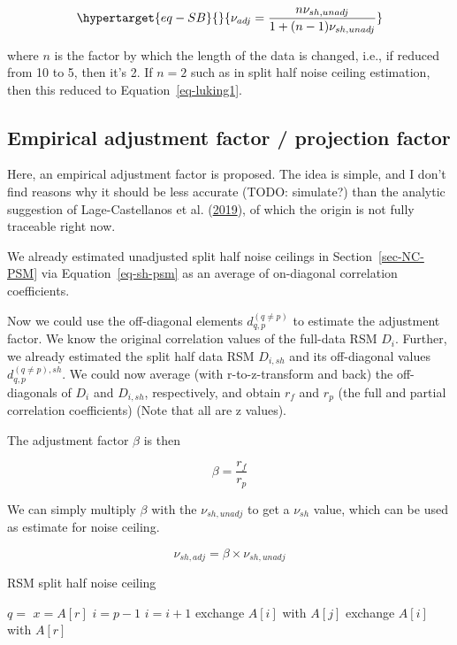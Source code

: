\documentclass[
  letterpaper,
  DIV=11,
  numbers=noendperiod]{scrartcl}
\begin{document}
\begin{equation}\protect\hypertarget{eq-SB}{}{
\nu_{adj}=\frac{n \nu_{sh,unadj}}{1+(n-1) \nu_{sh,unadj}}
}\label{eq-SB}\end{equation}

where \(n\) is the factor by which the length of the data is changed,
i.e., if reduced from 10 to 5, then it's 2. If \(n=2\) such as in split
half noise ceiling estimation, then this reduced to
Equation~\ref{eq-luking1}.

\hypertarget{sec-adj-emp}{%
\subsection{Empirical adjustment factor / projection
factor}\label{sec-adj-emp}}

Here, an empirical adjustment factor is proposed. The idea is simple,
and I don't find reasons why it should be less accurate (TODO:
simulate?) than the analytic suggestion of Lage-Castellanos et al.
(\protect\hyperlink{ref-lage-castellanos2019}{2019}), of which the
origin is not fully traceable right now.

We already estimated unadjusted split half noise ceilings in
Section~\ref{sec-NC-PSM} via Equation~\ref{eq-sh-psm} as an average of
on-diagonal correlation coefficients.

Now we could use the off-diagonal elements \(d_{q,p}^{(q \ne p)}\) to
estimate the adjustment factor. We know the original correlation values
of the full-data RSM \(D_i\). Further, we already estimated the split
half data RSM \(D_{i,sh}\) and its off-diagonal values
\(d_{q,p}^{(q \ne p), sh}\). We could now average (with r-to-z-transform
and back) the off-diagonals of \(D_i\) and \(D_{i,sh}\), respectively,
and obtain \(r_f\) and \(r_p\) (the full and partial correlation
coefficients) (Note that all are z values).

The adjustment factor \(\beta\) is then

\[
\beta =  \frac{r_f}{r_p}
\]

We can simply multiply \(\beta\) with the \(\nu_{sh,unadj}\) to get a
\(\nu_{sh}\) value, which can be used as estimate for noise ceiling.

\[
\nu_{sh,adj} =  \beta \times \nu_{sh, unadj} 
\]

\begin{algorithm}[htb!]
\caption{RSM split half noise ceiling}
\label{alg-quicksort}
\begin{algorithmic}[1]
    \State $q = $ 
    \State {}
    \State {}
  \EndIf
\EndProcedure
{}
  \State $x = A[r]$
  \State $i = p - 1$
      \State $i = i + 1$
      \State exchange
      $A[i]$ with     $A[j]$
    \EndIf
    \State exchange $A[i]$ with $A[r]$
  \EndFor
\EndProcedure
\end{algorithmic}
\end{algorithm}
\end{document}
